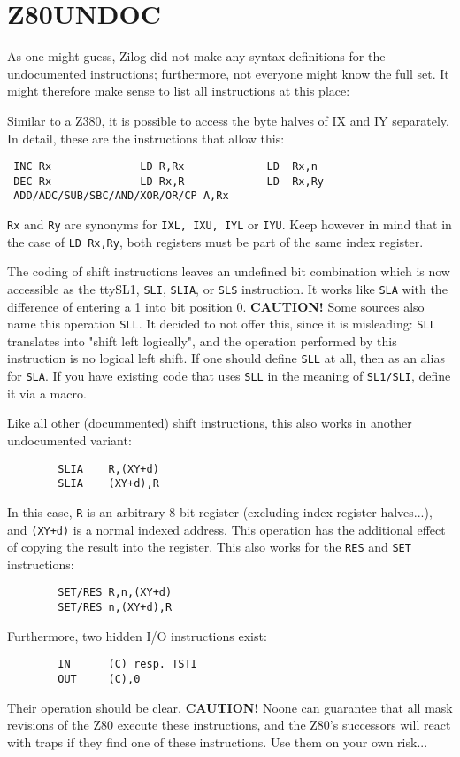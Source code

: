 \documentclass[12pt,twoside]{report}
\newcommand{\bb}[1]{{\bf #1}}
\newcommand{\tty}[1]{{\tt #1}}
\begin{document}

\section{Z80UNDOC}

As one might guess, Zilog did not make any syntax definitions for the
undocumented instructions; furthermore, not everyone might know the
full set.  It might therefore make sense to list all instructions at
this place:

Similar to a Z380, it is possible to access the byte halves of IX and
IY separately.  In detail, these are the instructions that allow
this:
\begin{verbatim}
 INC Rx              LD R,Rx             LD  Rx,n
 DEC Rx              LD Rx,R             LD  Rx,Ry
 ADD/ADC/SUB/SBC/AND/XOR/OR/CP A,Rx
\end{verbatim}
\tty{Rx} and \tty{Ry} are synonyms for \tty{IXL, IXU, IYL} or \tty{IYU}.
Keep however in mind that in the case of \tty{LD  Rx,Ry}, both registers
must be part of the same index register.

The coding of shift instructions leaves an undefined bit combination which
is now accessible as the tty{SL1}, \tty{SLI}, \tty{SLIA}, or \tty{SLS}
instruction.  It works like \tty{SLA} with the difference of entering a 1
into bit position 0.  \bb{CAUTION!} Some sources also name this operation
\tty{SLL}.  It decided to not offer this, since it is misleading: \tty{SLL}
translates into "shift left logically", and the operation performed by this
instruction is no logical left shift.  If one should define \tty{SLL} at
all, then as an alias for \tty{SLA}.  If you have existing code that uses
\tty{SLL} in the meaning of \tty{SL1/SLI}, define it via a macro.

Like all other (docummented) shift instructions, this also works in
another undocumented variant:
\begin{verbatim}
        SLIA    R,(XY+d)
        SLIA    (XY+d),R
\end{verbatim}
In this case, \tty{R} is an arbitrary 8-bit register (excluding index
register halves...), and \tty{(XY+d)} is a normal indexed address.  This
operation has the additional effect of copying the result into the
register.  This also works for the \tty{RES} and \tty{SET} instructions:
\begin{verbatim}
        SET/RES R,n,(XY+d)
        SET/RES n,(XY+d),R
\end{verbatim}
Furthermore, two hidden I/O instructions exist:
\begin{verbatim}
        IN      (C) resp. TSTI
        OUT     (C),0
\end{verbatim}
Their operation should be clear.  \bb{CAUTION!}  Noone can
guarantee that all mask revisions of the Z80 execute these
instructions, and the Z80's successors will react with traps if they
find one of these instructions.  Use them on your own risk...
\end{document}
